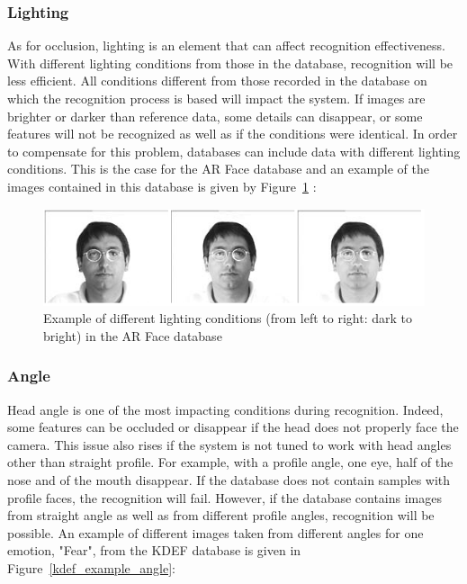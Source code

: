 \subsubsection{Lighting}

\vspace{\baselineskip}
\noindent As for occlusion, lighting is an element that can affect recognition effectiveness. With different lighting conditions from those in the database, recognition will be less efficient. All conditions different from those recorded  in the database on which the recognition process is based will impact the system. If images are brighter or darker than reference data, some details can disappear, or some features will not be recognized as well as if the conditions were identical. In order to compensate for this problem, databases can include data with different lighting conditions. This is the case for the AR Face database and an example of the images contained in this database is given by Figure~\ref{arface_example1} \cite{ARFACE}:
\newline

\begin{figure}[!h]
\begin{center}
\noindent \includegraphics[scale=0.7]{figures/arface_example1} 
\newline
\caption{Example of different lighting conditions (from left to right: dark to bright) in the AR Face database}
\label{arface_example1}
\end{center} 
\end{figure}

\subsubsection{Angle}

\vspace{\baselineskip}
\noindent Head angle is one of the most impacting conditions during recognition. Indeed, some features can be occluded or disappear if the head does not properly face the camera. This issue also rises if the system is not tuned to work with head angles other than straight profile. For example, with a profile angle, one eye, half of the nose and of the mouth disappear. If the database does not contain samples with profile faces, the recognition will fail. However, if the database contains images from straight angle as well as from different profile angles, recognition will be possible. An example of different images taken from different angles for one emotion, "Fear", from the KDEF database is given in Figure~\ref{kdef_example_angle}:
\newline

